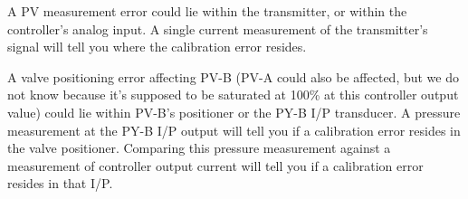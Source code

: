 





A PV measurement error could lie within the transmitter, or within the controller's analog input.  A single current measurement of the transmitter's signal will tell you where the calibration error resides.

\vskip 10pt

A valve positioning error affecting PV-B (PV-A could also be affected, but we do not know because it's supposed to be saturated at 100\% at this controller output value) could lie within PV-B's positioner or the PY-B I/P transducer.  A pressure measurement at the PY-B I/P output will tell you if a calibration error resides in the valve positioner.  Comparing this pressure measurement against a measurement of controller output current will tell you if a calibration error resides in that I/P.



